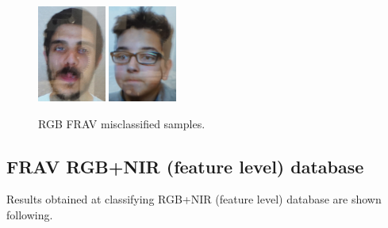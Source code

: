 \begin{figure}[htb]
\centering
\includegraphics[width=0.2\textwidth]{images_databases/frav_tablet_109.JPG}
\includegraphics[width=0.2\textwidth]{images_databases/frav_tablet_162.JPG}
\caption{RGB FRAV misclassified samples.} \label{fig:frav_miscl}
\end{figure}

\subsection{FRAV RGB+NIR (feature level) database}
Results obtained at classifying RGB+NIR (feature level) database are shown following.\\


